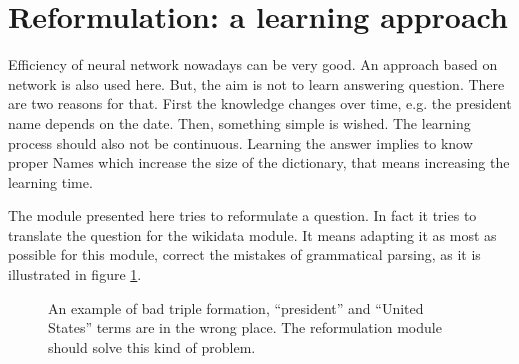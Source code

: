 \section{Reformulation: a learning approach }
\label{mlreformulation}

\FloatBarrier

Efficiency of neural network nowadays can be very good. An approach based on network is also used here. But, the aim is not to learn answering question. There are two reasons for that. First the knowledge changes over time, e.g. the president name depends on the date. Then, something simple is wished. The learning process should also not be continuous. Learning the answer implies to know proper Names which increase the size of the dictionary, that means increasing the learning time. 

The module presented here tries to reformulate a question. In fact it tries to translate the question for the wikidata module. It means adapting it as most as possible for this module, correct the mistakes of grammatical parsing, as it is illustrated in figure \ref{figexmlrefref}.

\begin{figure}
    \centering
 \caption{An example of bad triple formation, ``president'' and ``United States'' terms are in the wrong place. The reformulation module should solve this kind of problem.}
\label{figexmlrefref}
\end{figure}

